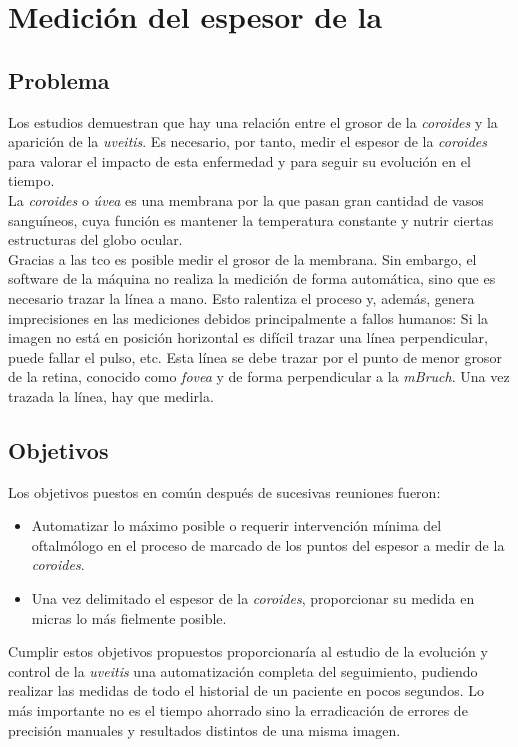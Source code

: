 \chapter{Medición del espesor de la }
\section{Problema}
Los estudios demuestran que hay una relación entre el grosor de la
\emph{\gls{coroides}} y la aparición de la \emph{\gls{uveitis}}. Es
necesario, por tanto, medir el espesor de la \emph{\gls{coroides}}
para valorar el impacto de esta enfermedad y para seguir su evolución
en el tiempo.\\
La \emph{\gls{coroides}} o \emph{úvea} es una membrana por la que
pasan gran cantidad de vasos sanguíneos, cuya función es mantener la
temperatura
constante y nutrir ciertas estructuras del globo ocular. \\
Gracias a las \gls{tco} es posible medir el grosor de la membrana. Sin
embargo, el software de la máquina no realiza la medición de forma
automática, sino que es necesario trazar la línea a mano. Esto
ralentiza el proceso y, además, genera imprecisiones en las mediciones
debidos principalmente a fallos humanos: Si la imagen no está en
posición horizontal es difícil trazar una línea perpendicular, puede
fallar el pulso, etc. Esta línea se debe trazar por el punto de menor
grosor de la retina, conocido como \emph{\gls{fovea}} y de forma
perpendicular a la \emph{\gls{mBruch}}. Una vez trazada la línea, hay
que medirla.


\section{Objetivos}
Los objetivos puestos en común después de sucesivas reuniones fueron:
\begin{itemize}
\item Automatizar lo máximo posible o requerir intervención mínima del
  oftalmólogo en el proceso de marcado de los puntos del espesor a
  medir de la \emph{\gls{coroides}}.
\item Una vez delimitado el espesor de la \emph{\gls{coroides}},
  proporcionar su medida en micras lo más fielmente posible.
\end{itemize}
Cumplir estos objetivos propuestos proporcionaría al estudio de la
evolución y control de la \emph{\gls{uveitis}} una automatización
completa del seguimiento, pudiendo realizar las medidas de todo el
historial de un paciente en pocos segundos. Lo más importante no es el
tiempo ahorrado sino la erradicación de errores de precisión manuales
y resultados distintos de una misma imagen.


